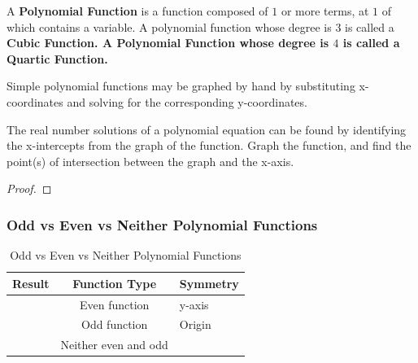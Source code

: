 
\begin{definition}
    A \textbf{Polynomial Function} is a function composed of $1$ or more terms, at
    $1$ of which contains a variable. A polynomial function whose degree
    is $3$ is called a \bf{Cubic Function}. A \bf{Polynomial Function} whose
    degree is $4$ is called a \textbf{Quartic Function}.
    
    Simple polynomial functions may be graphed by hand by substituting x-coordinates and solving for the corresponding y-coordinates.
    
    The real number solutions of a polynomial equation can be found by identifying the x-intercepts from the graph of the function. Graph the function, and find the point(s) of intersection between the graph and the x-axis.
\end{definition}

\begin{proof}
  \lipsum[5]
\end{proof}

\subsubsection*{Odd vs Even vs Neither Polynomial Functions}

\begin{center}
	\begin{table}[h]
		\begin{tabular}{ |r|c|l| } 
			\hline
			Result & Function Type & Symmetry \\
			\hline
			\multirow{3}{4em}{} $f(-x) = f(x)$	                & Even function	       &  y-axis    \\
                                $f(-x) = -f(x)$                 & Odd function         &  Origin    \\
                                $f(-x) \neq f(x)$ or $f(-x)$    & Neither even and odd &            \\
								\hline
		\end{tabular}

		\caption{Odd vs Even vs Neither Polynomial Functions}
		\label{table:odd-vs-even-vs-neither-polynomial-functions}
	\end{table}
\end{center}

\newpage
